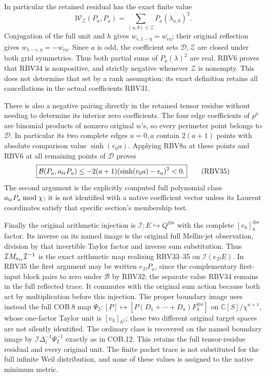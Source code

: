 \documentclass[11pt,a4paper]{article}
\begin{document}
In particular the retained residual has the exact finite value
\[
\mathcal W_{\mathcal Z}(P_a,P_a)
 =\sum_{(u,b)\in\mathcal Z}P_a(\lambda_{u,b})^2.
\tag{RBV34}
\]
Conjugation of the full unit and $h$ gives
$w_{\epsilon,1-\eta}=\overline{w_{\epsilon\eta}}$;
their original reflection gives
$w_{1-\epsilon,\eta}=-\overline{w_{\epsilon\eta}}$.
Since $a$ is odd, the coefficient sets $\mathcal D,\mathcal Z$
are closed under both grid symmetries. Thus both partial sums of
$P_a(\lambda)^2$ are real. RBV6 proves that RBV34 is nonpositive,
and strictly negative whenever $\mathcal Z$ is nonempty. This
does not determine that set by a rank assumption: its exact definition
retains all cancellations in the actual coefficients RBV31.

There is also a negative pairing directly in the retained tensor
residue without needing to determine its interior zero coefficients.
The four edge coefficients of $p^a$ are binomial products of
nonzero original $w$'s, so every perimeter point belongs to
$\mathcal D$. In particular its two complete edges $u=0,a$
contain $2(a+1)$ points with absolute comparison value
$\sinh(r_0a)$. Applying RBV8a at these points and RBV6 at all
remaining points of $\mathcal D$ proves
\[
\boxed{\mathcal B(P_a,a_{\rm tr}P_a)
 \le-2(a+1)(\sinh(r_0a)-\epsilon_a)^2<0.}\tag{RBV35}
\]
The second argument is the explicitly computed full polynomial
class $a_{\rm tr}P_a\bmod\chi$; it is not identified with a native
coefficient vector unless its Laurent coordinates satisfy that
specific section's membership test.

Finally the original arithmetic injection is
$\mathcal I:E\hookrightarrow Q^{\otimes a}$ with the complete
$[v_h]_h^{\otimes a}$ factor. Its inverse on its named image is
the original full Mellin-jet observation, division by that invertible
Taylor factor and inverse sum substitution. Thus
$\mathcal I M_{a_{\rm tr}}\mathcal I^{-1}$ is the exact arithmetic
map realizing RBV33--35 on $\mathcal I(e_{\mathcal D}E)$.
In RBV35 the first argument may be written $e_{\mathcal D}P_a$,
since the complementary first-input block pairs to zero under
$\mathcal B$ by RBV32; the separate value RBV34 remains in
the full reflected trace.
It commutes with the original sum action because both act by
multiplication before this injection. The proper boundary image
uses instead the full COB.8 map
$\Psi_2:[P]\mapsto[P(D_1+\cdots+D_a)F_h^{\otimes a}]$
on $\mathbb C[S]/\chi^{a+1}$, whose one-factor Taylor unit is
$[v_h]_{h^2}$; these two different original target spaces are not
silently identified. The ordinary class is recovered on the named
boundary image by $\mathcal I\Delta_i^{-1}\Psi_2^{-1}$ exactly
as in COB.12. This retains the full tensor-residue residual and
every original unit. The finite packet trace is not substituted
for the full infinite Weil distribution, and none of these values
is assigned to the native minimum metric.
\end{document}
